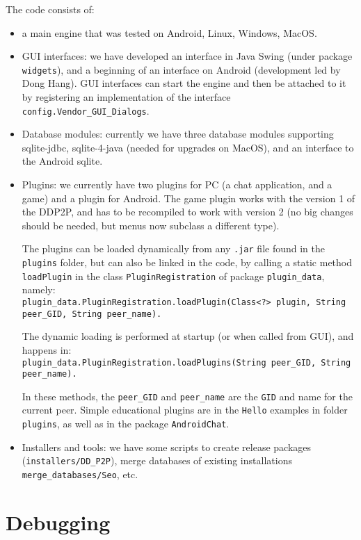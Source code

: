 \documentclass{book}
\begin{document}
The code consists of:
\begin{itemize}
\item a main engine that was tested on Android, Linux, Windows, MacOS.
\item GUI interfaces: we have developed an interface in Java Swing (under package {\tt widgets}), and a beginning of an interface on Android (development led by Dong Hang). GUI interfaces can start the engine and then be attached to it by registering an implementation of the interface {\tt config.Vendor\_GUI\_Dialogs}.
\item Database modules: currently we have three database modules supporting sqlite-jdbc, sqlite-4-java (needed for upgrades on MacOS), and an interface to the Android sqlite.
\item Plugins: we currently have two plugins for PC (a chat application, and a game) and a plugin for Android. The game plugin works with the version 1 of the DDP2P, and has to be recompiled to work with version 2 (no big changes should be needed, but menus now subclass a different type).
 
The plugins can be loaded dynamically from any {\tt .jar} file found in the {\tt plugins} folder, but can also be linked in the code, by calling a static method {\tt loadPlugin} 
in the class {\tt PluginRegistration} of package {\tt plugin\_data}, namely:\\
 {\tt plugin\_data.PluginRegistration.loadPlugin(Class<?> plugin, String peer\_GID, String peer\_name).}

The dynamic loading is performed at startup (or when called from GUI), and happens in:\\
 {\tt plugin\_data.PluginRegistration.loadPlugins(String peer\_GID, String peer\_name).}

In these methods, the {\tt peer\_GID} and {\tt peer\_name} are the {\tt GID} and name for the current peer.
Simple educational plugins are in the {\tt Hello} examples in folder {\tt plugins}, as well as in the package {\tt AndroidChat}. 
\item Installers and tools: we have some scripts to create release packages ({\tt installers/DD\_P2P}), merge databases of existing installations {\tt merge\_databases/Seo}, etc.
\end{itemize}

\section{Debugging}
\end{document}

